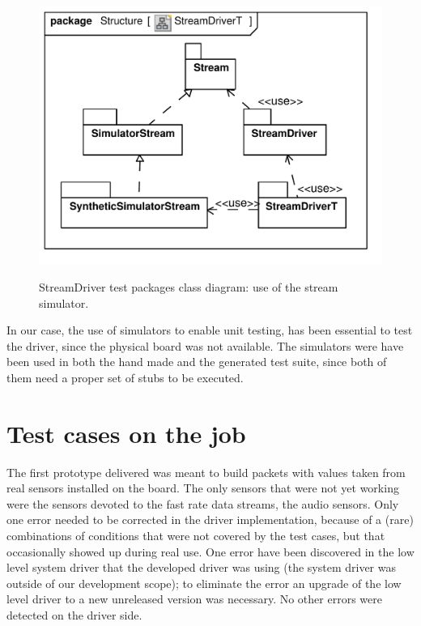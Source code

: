 \documentclass{article} \usepackage{times}
\begin{document}
\begin{figure}[htb!]
  \centering
  \includegraphics[scale=0.4]{UML_model/Class_Diagram__Structure__StreamDriverT}
  \label{fig:class_diagram_streamdriver_test}
  \caption{StreamDriver test packages class diagram: use of the stream
    simulator.}
\end{figure}

In our case, the use of simulators to enable unit testing, has been
essential to test the \STSB driver, since the physical board was not
available.  The simulators were have been used in both the hand made
and the generated test suite, since both of them need a proper set of
stubs to be executed.



\section{Test cases on the job}
\label{sec:test_cases_on_the_job}

The first prototype delivered was meant to build packets with values
taken from real sensors installed on the board.  The only sensors that
were not yet working were the sensors devoted to the fast rate data
streams, the audio sensors.  Only one error needed to be corrected in
the driver implementation, because of a (rare) combinations of
conditions that were not covered by the test cases, but that
occasionally showed up during real use.  One error have been
discovered in the low level system driver that the developed driver
was using (the system driver was outside of our development scope); to
eliminate the error an upgrade of the low level driver to a new
unreleased version was necessary.  No other errors were detected on
the driver side.
\end{document}
